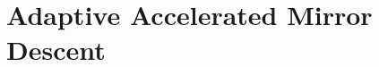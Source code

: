 \documentclass{article}
\theoremstyle{plain}
\theoremstyle{definition}
\theoremstyle{remark}
\newtheorem{remark}[theorem]{Remark}
\begin{document}

%

\section{Adaptive Accelerated Mirror Descent}
\end{document}
